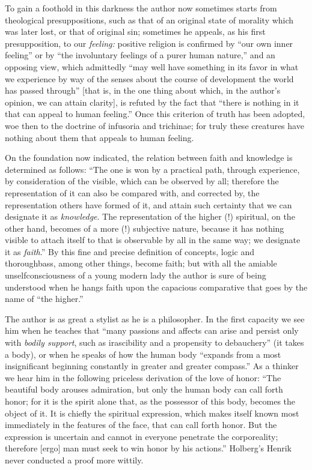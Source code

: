 \documentclass[12pt,a4paper,openany]{book}
\newcommand{\opage}[1]{\marginnote{\footnotesize\textit{[#1]}}}
\begin{document}
To gain a foothold in this darkness the author now sometimes starts from
theological presuppositions, such as that of an original state of morality
which was later lost, or that of original sin; sometimes he appeals, as his
first presupposition, to our \emph{feeling:} positive religion is confirmed
by ``our own inner feeling'' or by ``the involuntary feelings of a purer
human nature,'' and an opposing view, which admittedly ``may well have
something in its favor in what we experience by way of the senses about the
course of development the world has passed through'' [that is, in the one
thing about which, in the author's opinion, we can attain clarity], is
refuted by the fact that ``there is nothing in it that can appeal to human
feeling.'' Once this criterion of truth has been adopted, woe then to the
doctrine of infusoria and trichinae; for truly these creatures have nothing
about them that appeals to human feeling.

On the foundation now indicated, the relation between faith and knowledge
is determined as follows: ``The one is won by a practical path, through
experience, by consideration of the visible, which can be observed by all;
therefore the representation of it can also be
\opage{24}compared with, and corrected by, the representation others have
formed of it, and attain such certainty that we can designate it as
\emph{knowledge}. The representation of the higher (!) spiritual, on the
other hand, becomes of a more (!) subjective nature, because it has nothing
visible to attach itself to that is observable by all in the same way; we
designate it as \emph{faith}.'' By this fine and precise definition of
concepts, logic and thoroughbass, among other things, become faith; but
with all the amiable unselfconsciousness of a young modern lady the author
is sure of being understood when he hangs faith upon the capacious
comparative that goes by the name of ``the higher.''

The author is as great a stylist as he is a philosopher. In the first
capacity we see him when he teaches that ``many passions and affects can
arise and persist only with \emph{bodily support}, such as irascibility and
a propensity to debauchery'' (it takes a body), or when he speaks of how
the human body ``expands from a most insignificant beginning constantly in
greater and greater compass.'' As a thinker we hear him in the following
priceless derivation of the love of honor: ``The beautiful body arouses
admiration, but only the human body can call forth honor; for it is the
spirit alone that, as the possessor of this body, becomes the object of it.
It is chiefly the spiritual expression, which makes itself known most
immediately in the features of the face, that can call forth honor. But the
expression is uncertain and cannot in everyone penetrate the corporeality;
therefore [ergo] man must seek to win honor by his actions.'' Holberg's
Henrik never conducted a proof more wittily.
\end{document}
